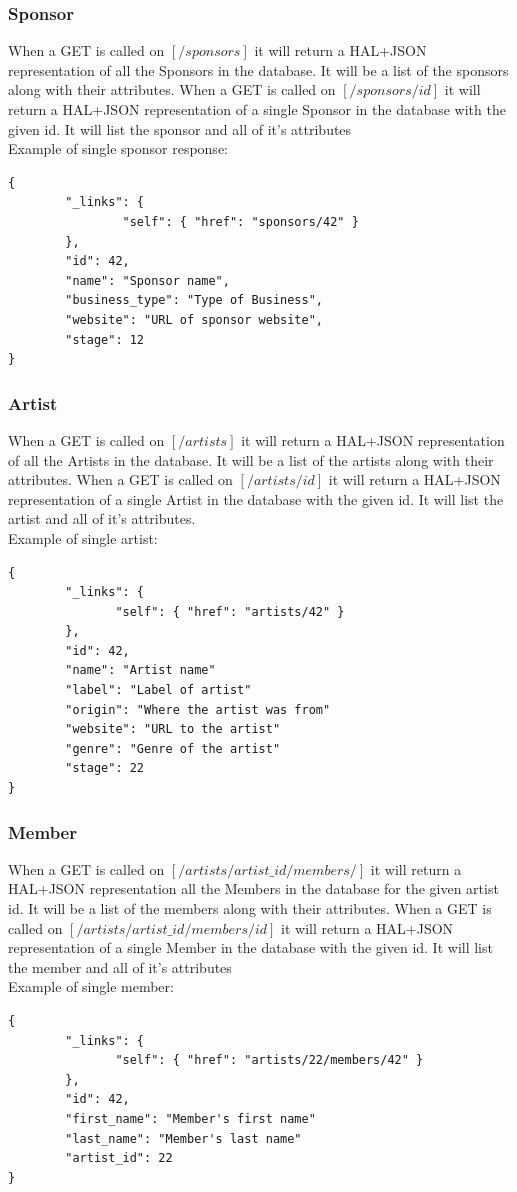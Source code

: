 \documentclass[12pt,english]{scrartcl}
\begin{document}
\subsubsection{Sponsor}
When a GET is called on $[/sponsors]$ it will return a HAL+JSON representation of all the Sponsors in the database.  It will be a list of the sponsors along with their attributes.
When a GET is called on $[/sponsors/{id}]$ it will return a HAL+JSON representation of a single Sponsor in the database with the given id.  It will list the sponsor and all of it's attributes
\\
Example of single sponsor response:
\begin{verbatim}
{
        "_links": {
                "self": { "href": "sponsors/42" }
        },
        "id": 42,
        "name": "Sponsor name",
        "business_type": "Type of Business",
        "website": "URL of sponsor website",
        "stage": 12
}
\end{verbatim}

\subsubsection{Artist}
When a GET is called on $[/artists]$ it will return a HAL+JSON representation of all the Artists in the database.  It will be a list of the artists along with their attributes.
When a GET is called on $[/artists/{id}]$ it will return a HAL+JSON representation of a single Artist in the database with the given id.  It will list the artist and all of it's attributes.
\\
Example of single artist:
\begin{verbatim}
{
        "_links": {
               "self": { "href": "artists/42" }
        },
        "id": 42,
        "name": "Artist name"
        "label": "Label of artist"
        "origin": "Where the artist was from"
        "website": "URL to the artist"
        "genre": "Genre of the artist"
        "stage": 22
}
\end{verbatim}
\subsubsection{Member}
When a GET is called on $[/artists/{artist\_id}/members/]$ it will return a HAL+JSON representation all the Members in the database for the given artist id.  It will be a list of the members along with their attributes.
When a GET is called on $[/artists/{artist\_id}/members/{id}]$ it will return a HAL+JSON representation of a single Member in the database with the given id.  It will list the member and all of it's attributes
\\
Example of single member:
\begin{verbatim}
{
        "_links": {
               "self": { "href": "artists/22/members/42" }
        },
        "id": 42,
        "first_name": "Member's first name"
        "last_name": "Member's last name"
        "artist_id": 22
}
\end{verbatim}
\end{document}

